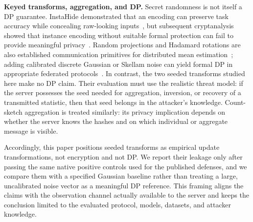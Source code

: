 \textbf{Keyed transforms, aggregation, and DP.}
Secret randomness is not itself a DP guarantee. InstaHide demonstrated that an encoding can preserve task accuracy while concealing raw-looking inputs~\cite{huang2020instahide}, but subsequent cryptanalysis showed that instance encoding without suitable formal protection can fail to provide meaningful privacy~\cite{carlini2021instance}. Random projections and Hadamard rotations are also established communication primitives for distributed mean estimation~\cite{suresh2017dme}; adding calibrated discrete Gaussian or Skellam noise can yield formal DP in appropriate federated protocols~\cite{kairouz2021ddg,agarwal2021skellam}. In contrast, the two seeded transforms studied here make no DP claim. Their evaluation must use the realistic threat model: if the server possesses the seed needed for aggregation, inversion, or recovery of a transmitted statistic, then that seed belongs in the attacker's knowledge. Count-sketch aggregation is treated similarly: its privacy implication depends on whether the server knows the hashes and on which individual or aggregate message is visible.

Accordingly, this paper positions seeded transforms as empirical update transformations, not encryption and not DP. We report their leakage only after passing the same native positive controls used for the published defenses, and we compare them with a specified Gaussian baseline rather than treating a large, uncalibrated noise vector as a meaningful DP reference. This framing aligns the claims with the observation channel actually available to the server and keeps the conclusion limited to the evaluated protocol, models, datasets, and attacker knowledge.

